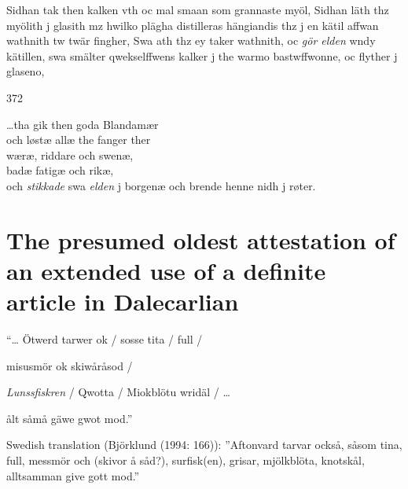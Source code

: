 \begin{styleBodyTextFirst}
Sidhan tak then kalken vth oc mal smaan som grannaste myöl, Sidhan läth thz myölith j glasith mz hwilko plägha distilleras hängiandis thz j en kätil affwan wathnith tw twär fingher, Swa ath thz ey taker wathnith, oc \textit{gör elden} wndy kätillen, swa smälter qwekselffwens kalker j the warmo bastwffwonne, oc flyther j glaseno, 

\end{styleBodyTextFirst}

372

\begin{styleBlockQuote}
…tha gik then goda Blandamær\\
och løstæ allæ the fanger ther\\
wæræ, riddare och swenæ,\\
badæ fatigæ och rikæ,\\
och \textit{stikkade} swa \textit{elden} j borgenæ och brende henne nidh j røter.

\end{styleBlockQuote}

\section{The presumed oldest attestation of an extended use of a definite article in Dalecarlian}

\begin{styleListii}
“… Ötwerd tarwer ok / sosse tita / full /

\end{styleListii}

\begin{styleListii}
misusmör ok skiwåråsod /

\end{styleListii}

\begin{styleListii}
\textit{Lunssfiskren} / Qwotta / Miokblötu wridäl / …

\end{styleListii}

\begin{styleListii}
ålt såmå gäwe gwot mod.”

\end{styleListii}

Swedish translation (Björklund (1994: 166)): ”Aftonvard tarvar också, såsom tina, full, messmör och (skivor å såd?), surfisk(en), grisar, mjölkblöta, knotskål, alltsamman give gott mod.”

